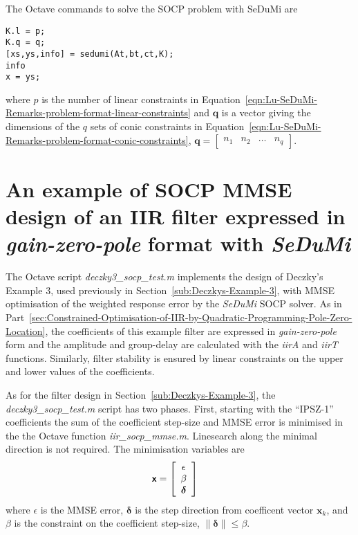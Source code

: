 \documentclass[a4paper,twoside,10pt,english]{report}
\begin{document}
The Octave commands to solve the SOCP problem with SeDuMi are
\begin{small}
\begin{verbatim}
K.l = p;
K.q = q;
[xs,ys,info] = sedumi(At,bt,ct,K);
info
x = ys;
\end{verbatim}
\end{small}
where $p$ is the number of linear constraints in 
Equation~\ref{eqn:Lu-SeDuMi-Remarks-problem-format-linear-constraints} and 
$\boldsymbol{q}$ is a vector giving the dimensions of the $q$ sets of conic
constraints in 
Equation~\ref{eqn:Lu-SeDuMi-Remarks-problem-format-conic-constraints},
$\boldsymbol{q}=\left[\begin{array}{cccc}n_{1} & n_{2} & \hdots & n_{q}
\end{array}\right]$.
\clearpage
\section{\label{sec:Deczky3-IIR-filter-gain-zero-pole-with-SeDuMi}An example of SOCP MMSE design of an IIR filter expressed in \emph{gain-zero-pole} format with \emph{SeDuMi}}
The Octave script \emph{deczky3\_socp\_test.m} implements the design of Deczky's
Example 3, used previously in Section~\ref{sub:Deczkys-Example-3}, with MMSE 
optimisation of the weighted response error by the \emph{SeDuMi} SOCP solver.
As in Part~\ref{sec:Constrained-Optimisation-of-IIR-by-Quadratic-Programming-Pole-Zero-Location}, 
the coefficients of this example filter are expressed in \emph{gain-zero-pole}
form and the amplitude and group-delay are calculated with the \emph{iirA} and
\emph{iirT} functions. Similarly, filter stability is ensured
by linear constraints on the upper and lower values of the coefficients.

As for the filter design in Section~\ref{sub:Deczkys-Example-3}, the 
\emph{deczky3\_socp\_test.m} script has two phases. First, starting with the
``IPSZ-1'' coefficients the sum of the coefficient step-size and MMSE error
is minimised in the the Octave function \emph{iir\_socp\_mmse.m}. Linesearch
along the minimal direction is not required. The minimisation variables are
\begin{align*}
\text{\textsf{\textbf{x}}} &= \left[\begin{array}{c}
\epsilon \\
\beta \\
\boldsymbol{\delta}
\end{array}\right]
\end{align*}
where $\epsilon$ is the MMSE error, 
$\boldsymbol{\delta}$ is the step direction from coefficent vector 
$\boldsymbol{x}_{k}$, and $\beta$ is the constraint on the coefficient
step-size, $\|\boldsymbol{\delta}\| \le \beta$.
\end{document}
